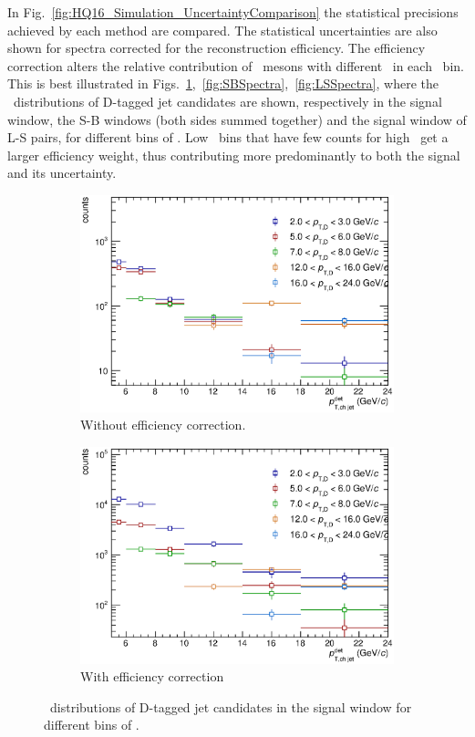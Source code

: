 In Fig.~\ref{fig:HQ16_Simulation_UncertaintyComparison} the statistical precisions achieved by each method are compared. The statistical uncertainties are
also shown for spectra corrected for the reconstruction efficiency. The efficiency correction alters the 
relative contribution of \Dzero\ mesons with different \pt\ in each \ptchjet\ bin. This is best illustrated in Figs.~\ref{fig:SigSpectra},~\ref{fig:SBSpectra},~\ref{fig:LSSpectra}, where the \ptchjetdet\ distributions
of D-tagged jet candidates are shown, respectively in the signal window, the S-B windows (both sides summed together) and the signal window of L-S pairs,
for different bins of \ptd. Low \ptd\ bins that have few counts for high \ptchjetdet\ get a larger efficiency weight, thus contributing more predominantly to both the signal and
its uncertainty.
\begin{figure}[tbh]
\centering
\begin{subfigure}{0.49\textwidth}
  \centering
  \includegraphics[width=1.0\linewidth]{img/HQ16_Simulation_SigSpectra}
  \caption{Without efficiency correction.}
\end{subfigure}
\begin{subfigure}{0.49\textwidth}
  \centering
  \includegraphics[width=1.0\linewidth]{img/HQ16_Simulation_SigSpectra_Eff}
  \caption{With efficiency correction}
\end{subfigure}
\caption{\ptchjetdet\ distributions of D-tagged jet candidates in the signal window for different bins of \ptd.}
\label{fig:SigSpectra}
\end{figure}

